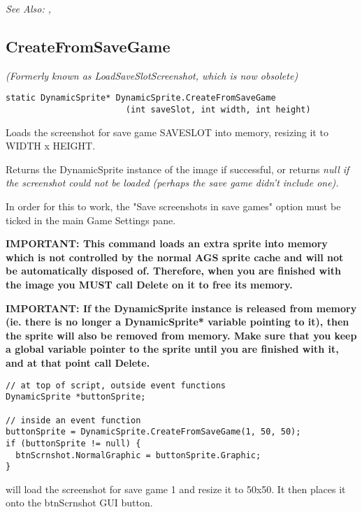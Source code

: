 \it{See Also:} ,


\subsection{CreateFromSaveGame}\label{DynamicSprite.CreateFromSaveGame}%

\it{(Formerly known as LoadSaveSlotScreenshot, which is now obsolete)}

\begin{verbatim}
static DynamicSprite* DynamicSprite.CreateFromSaveGame
                        (int saveSlot, int width, int height)
\end{verbatim}
Loads the screenshot for save game SAVESLOT into memory, resizing it to WIDTH x HEIGHT.

Returns the DynamicSprite instance of the image if successful, or returns \it{null} if
the screenshot could not be loaded (perhaps the save game didn't include one).

In order for this to work, the "Save screenshots in save games" option must be ticked
in the main Game Settings pane.

\bf{IMPORTANT:} This command loads an extra sprite into memory which is not controlled
by the normal AGS sprite cache and will not be automatically disposed of. Therefore, when
you are finished with the image you \bf{MUST} call Delete on it to free its memory.

\bf{IMPORTANT:} If the DynamicSprite instance is released from memory (ie. there is
no longer a DynamicSprite* variable pointing to it), then the sprite will also be
removed from memory. Make sure that you keep a global variable pointer to the sprite
until you are finished with it, and at that point call Delete.

\begin{verbatim}
// at top of script, outside event functions
DynamicSprite *buttonSprite;

// inside an event function
buttonSprite = DynamicSprite.CreateFromSaveGame(1, 50, 50);
if (buttonSprite != null) {
  btnScrnshot.NormalGraphic = buttonSprite.Graphic;
}
\end{verbatim}
will load the screenshot for save game 1 and resize it to 50x50. It then places it onto
the btnScrnshot GUI button.

